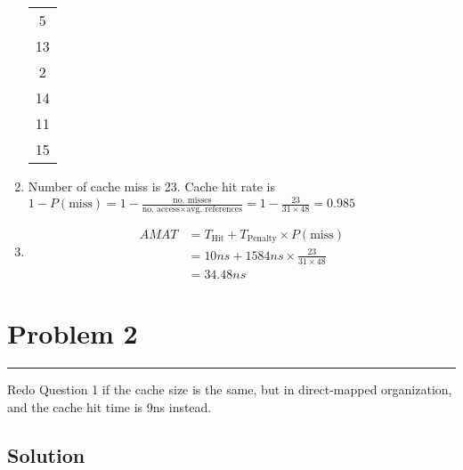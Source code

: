 \documentclass{article}
\begin{document}
\begin{enumerate}[label=(\alph*)]
\begin{table}[h]
\begin{tabular}{|c|}
                  5  \\
                  13 \\
                  \hline
                  2  \\
                  14 \\
                  \hline
                  11 \\
                  15 \\
                  \hline
              \end{tabular}
          \end{table}
    \item Number of cache miss is 23. Cache hit rate is $1-P(\text{miss}) = 1 - \frac{\text{no. misses}}{\text{no. access} \times \text{avg. references}} = 1- \frac{23}{31\times 48} = 0.985$
    \item \begin{align*}
              AMAT & = T_\text{Hit} + T_\text{Penalty} \times P(\text{miss}) \\
                   & = 10ns + 1584ns \times \frac{23}{31 \times 48}          \\
                   & = 34.48ns
          \end{align*}
\end{enumerate}

\section*{Problem 2}
\hrule
\vspace{0.5cm}

Redo Question 1 if the cache size is the same, but in direct-mapped organization,
and the cache hit time is 9ns instead.

\subsection*{Solution}
\end{document}
